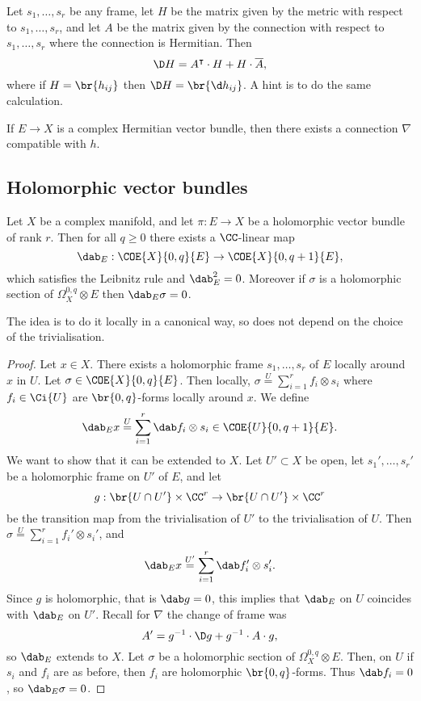 \begin{exercise*}
Let $ s_1, \dots, s_r $ be any frame, let $ H $ be the matrix given by the metric with respect to $ s_1, \dots, s_r $, and let $ A $ be the matrix given by the connection with respect to $ s_1, \dots, s_r $ where the connection is Hermitian. Then
$$ \D H = A^\intercal \cdot H + H \cdot \overline{A}, $$
where if $ H = \br{h_{ij}} $ then $ \D H = \br{\d h_{ij}} $. A hint is to do the same calculation.
\end{exercise*}

\begin{theorem}
If $ E \to X $ is a complex Hermitian vector bundle, then there exists a connection $ \nabla $ compatible with $ h $.
\end{theorem}

\subsection{Holomorphic vector bundles}


\begin{proposition}
\label{prop:5.9}
Let $ X $ be a complex manifold, and let $ \pi : E \to X $ be a holomorphic vector bundle of rank $ r $. Then for all $ q \ge 0 $ there exists a $ \CC $-linear map
$$ \dab_E : \COE{X}{0, q}{E} \to \COE{X}{0, q + 1}{E}, $$
which satisfies the Leibnitz rule and $ \dab_E^2 = 0 $. Moreover if $ \sigma $ is a holomorphic section of $ \Omega_X^{0, q} \otimes E $ then $ \dab_E\sigma = 0 $.
\end{proposition}

\pagebreak

The idea is to do it locally in a canonical way, so does not depend on the choice of the trivialisation.

\begin{proof}
Let $ x \in X $. There exists a holomorphic frame $ s_1, \dots, s_r $ of $ E $ locally around $ x $ in $ U $. Let $ \sigma \in \COE{X}{0, q}{E} $. Then locally, $ \sigma \overset{U}{=} \sum_{i = 1}^r f_i \otimes s_i $ where $ f_i \in \Ci{U} $ are $ \br{0, q} $-forms locally around $ x $. We define
$$ \dab_Ex \overset{U}{=} \sum_{i = 1}^r \dab f_i \otimes s_i \in \COE{U}{0, q + 1}{E}. $$
We want to show that it can be extended to $ X $. Let $ U' \subset X $ be open, let $ s_1', \dots, s_r' $ be a holomorphic frame on $ U' $ of $ E $, and let
$$ g : \br{U \cap U'} \times \CC^r \to \br{U \cap U'} \times \CC^r $$
be the transition map from the trivialisation of $ U' $ to the trivialisation of $ U $. Then $ \sigma \overset{U}{=} \sum_{i = 1}^r f_i' \otimes s_i' $, and
$$ \dab_Ex \overset{U'}{=} \sum_{i = 1}^r \dab f_i' \otimes s_i'. $$
Since $ g $ is holomorphic, that is $ \dab g = 0 $, this implies that $ \dab_E $ on $ U $ coincides with $ \dab_E $ on $ U' $. Recall for $ \nabla $ the change of frame was
$$ A' = g^{-1} \cdot \D g + g^{-1} \cdot A \cdot g, $$
so $ \dab_E $ extends to $ X $. Let $ \sigma $ be a holomorphic section of $ \Omega_X^{0, q} \otimes E $. Then, on $ U $ if $ s_i $ and $ f_i $ are as before, then $ f_i $ are holomorphic $ \br{0, q} $-forms. Thus $ \dab f_i = 0 $, so $ \dab_E\sigma = 0 $.
\end{proof}

